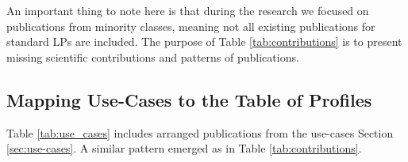 An important thing to note here is that during the research we focused on publications
from minority classes, meaning not all existing publications for standard LPs are included. 
The purpose of Table \ref{tab:contributions} is to present missing scientific contributions and patterns of publications.  

\newcommand{\tabVar}{\textbf{+ daily} \\ \textbf{dim}  }

\subsection{Mapping Use-Cases to the Table of Profiles}

Table \ref{tab:use_cases} includes arranged publications from the use-cases Section \ref{sec:use-cases}. 
A similar pattern emerged as in Table \ref{tab:contributions}. 

